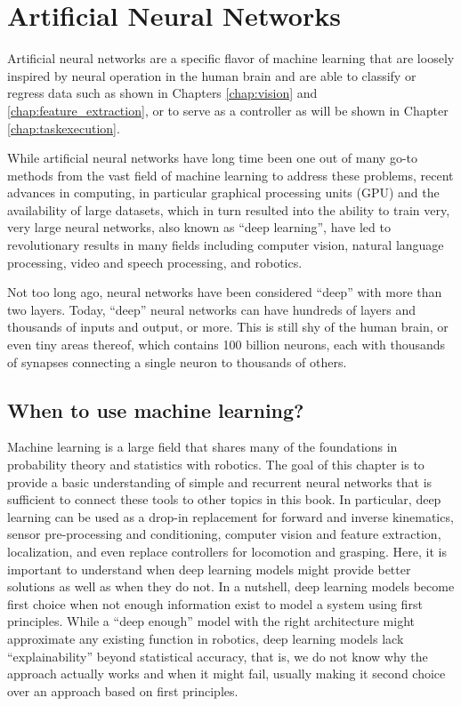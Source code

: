 \chapter{Artificial Neural Networks}\label{chap:ann}
Artificial neural networks are a specific flavor of machine learning that are loosely inspired by neural operation in the human brain and are able to classify or regress data such as shown in Chapters \ref{chap:vision} and \ref{chap:feature_extraction}, or to serve as a controller as will be shown in Chapter \ref{chap:taskexecution}.

While artificial neural networks have long time been one out of many go-to methods from the vast field of machine learning to address these problems, recent advances in computing, in particular graphical processing units (GPU) and the availability of large datasets, which in turn resulted into the ability to train very, very large neural networks, also known as ``deep learning'', have led to revolutionary results in many fields including computer vision, natural language processing, video and speech processing, and robotics.

Not too long ago, neural networks have been considered ``deep'' with more than two layers. Today, ``deep'' neural networks can have hundreds of layers and thousands of inputs and output, or more. This is still shy of the human brain, or even tiny areas thereof, which contains 100 billion neurons, each with thousands of synapses connecting a single neuron to thousands of others.

\section{When to use machine learning?}
Machine learning is a large field that shares many of the foundations in probability theory and statistics with robotics. The goal of this chapter is to provide a basic understanding of simple and recurrent neural networks that is sufficient to connect these tools to other topics in this book. In particular, deep learning can be used as a drop-in replacement for forward and inverse kinematics, sensor pre-processing and conditioning, computer vision and feature extraction, localization, and even replace controllers for locomotion and grasping. Here, it is important to understand when deep learning models might provide better solutions as well as when they do not. In a nutshell, deep learning models become first choice when not enough information exist to model a system using first principles. While a ``deep enough'' model with the right architecture might approximate any existing function in robotics, deep learning models lack ``explainability'' beyond statistical accuracy, that is, we do not know why the approach actually works and when it might fail, usually making it second choice over an approach based on first principles.


